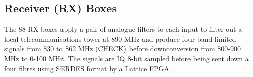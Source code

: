 \subsection{Receiver (RX) Boxes}
The 88 RX boxes apply a pair of analogue filters to each input to filter out a local telecommunications tower at 890 MHz and produce four band-limited signals from 830 to 862 MHz (CHECK) before downconversion from 800-900 MHz to 0-100 MHz. The signals are IQ 8-bit sampled before being sent down a four fibres using SERDES format by a Lattice FPGA.

